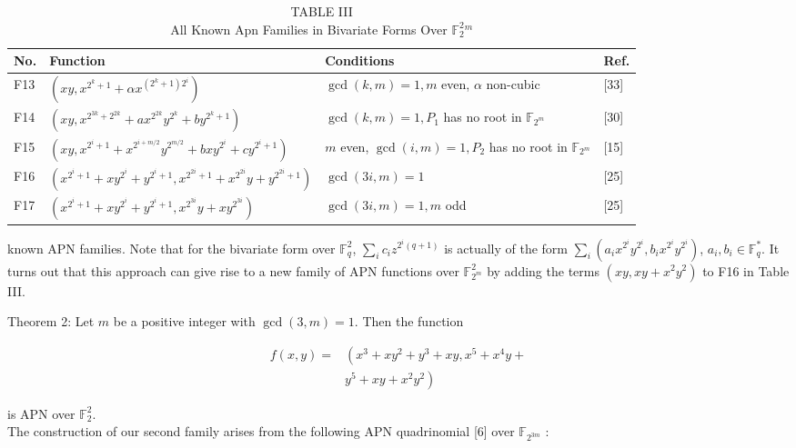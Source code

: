 \documentclass[10pt]{article}
\begin{document}
\begin{table}[h]
\begin{center}
\captionsetup{labelformat=empty}
\caption{TABLE III\\
All Known Apn Families in Bivariate Forms Over $\mathbb{F}_{2}^{2}{ }^{m}$}
\begin{tabular}{|l|l|l|l|}
\hline
No. & Function & Conditions & Ref. \\
\hline
F13 & $\left(x y, x^{2^{k}+1}+\alpha x^{\left(2^{k}+1\right) 2^{i}}\right)$ & $\operatorname{gcd}(k, m)=1, m$ even, $\alpha$ non-cubic & [33] \\
\hline
F14 & $\left(x y, x^{2^{3 k}+2^{2 k}}+a x^{2^{2 k}} y^{2^{k}}+b y^{2^{k}+1}\right)$ & $\operatorname{gcd}(k, m)=1, P_{1}$ has no root in $\mathbb{F}_{2^{m}}$ & [30] \\
\hline
F15 & $\left(x y, x^{2^{i}+1}+x^{2^{i+m / 2}} y^{2^{m / 2}}+b x y^{2^{i}}+c y^{2^{i}+1}\right)$ & $m$ even, $\operatorname{gcd}(i, m)=1, P_{2}$ has no root in $\mathbb{F}_{2^{m}}$ & [15] \\
\hline
F16 & $\left(x^{2^{i}+1}+x y^{2^{i}}+y^{2^{i}+1}, x^{2^{2 i}+1}+x^{2^{2 i}} y+y^{2^{2 i}+1}\right)$ & $\operatorname{gcd}(3 i, m)=1$ & [25] \\
\hline
F17 & $\left(x^{2^{i}+1}+x y^{2^{i}}+y^{2^{i}+1}, x^{2^{3 i}} y+x y^{2^{3 i}}\right)$ & $\operatorname{gcd}(3 i, m)=1, m$ odd & [25] \\
\hline
\end{tabular}
\end{center}
\end{table}

known APN families. Note that for the bivariate form over $\mathbb{F}_{q}^{2}$, $\sum_{i} c_{i} z^{2^{i}(q+1)}$ is actually of the form $\sum_{i}\left(a_{i} x^{2^{i}} y^{2^{i}}, b_{i} x^{2^{i}} y^{2^{i}}\right)$, $a_{i}, b_{i} \in \mathbb{F}_{q}^{*}$. It turns out that this approach can give rise to a new family of APN functions over $\mathbb{F}_{2^{m}}^{2}$ by adding the terms $\left(x y, x y+x^{2} y^{2}\right)$ to F16 in Table III.

Theorem 2: Let $m$ be a positive integer with $\operatorname{gcd}(3, m)=1$. Then the function

$$
\begin{aligned}
f(x, y)= & \left(x^{3}+x y^{2}+y^{3}+x y, x^{5}+x^{4} y+\right. \\
& \left.y^{5}+x y+x^{2} y^{2}\right)
\end{aligned}
$$

is APN over $\mathbb{F}_{2}^{2}$.\\[0pt]
The construction of our second family arises from the following APN quadrinomial [6] over $\mathbb{F}_{2^{3 m}}$ :
\end{document}
